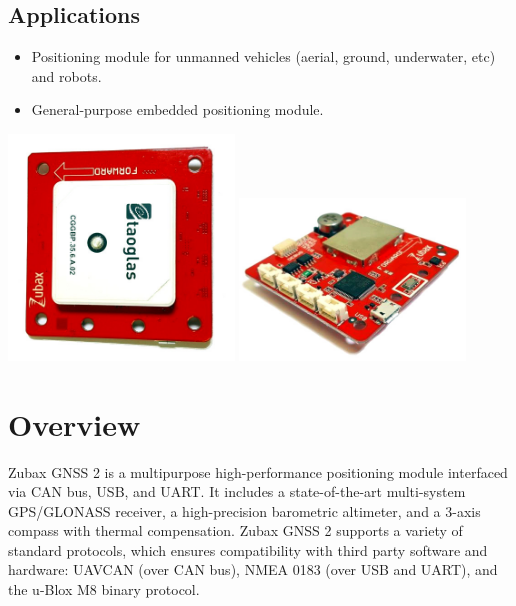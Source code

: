\documentclass{zubaxdoc}
\begin{document}
\begin{titlepage}
\BeginRightColumn

\section*{Applications}

\begin{itemize}
	\item Positioning module for unmanned vehicles (aerial, ground, underwater, etc) and robots.
    \item General-purpose embedded positioning module.
\end{itemize}

\centering
\includegraphics[width=0.45\textwidth]{GNSS_top}
\includegraphics[width=0.45\textwidth]{GNSS_bottom}
\end{titlepage}

\tableofcontents
\BeginRightColumn
\listoffigures
\listoftables

\mainmatter

\chapter{Overview}

Zubax GNSS 2 is a multipurpose high-performance positioning module interfaced via CAN bus, USB, and UART.
It includes a state-of-the-art multi-system GPS/GLONASS receiver, a high-precision barometric altimeter, and a 3-axis compass with thermal compensation.
Zubax GNSS 2 supports a variety of standard protocols, which ensures compatibility with third party software and hardware: UAVCAN (over CAN bus), NMEA 0183 (over USB and UART), and the u-Blox M8 binary protocol.
\end{document}
